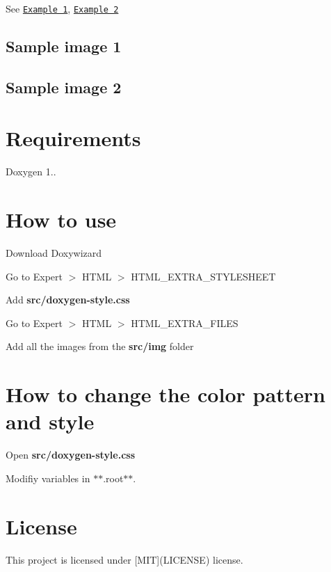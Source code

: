 See \href{http://kcwongjoe.code.com/directshow_camera/index.html}{\tt Example 1}, \href{http://kcwongjoe.code.com/serial_port/index.html}{\tt Example 2}

\subsection*{Sample image 1}



\subsection*{Sample image 2}



\section*{Requirements}

Doxygen 1..

\section*{How to use}


\begin{DoxyEnumerate}
\item Download Doxywizard
\item Go to Expert $>$ H\+T\+ML $>$ H\+T\+M\+L\+\_\+\+E\+X\+T\+R\+A\+\_\+\+S\+T\+Y\+L\+E\+S\+H\+E\+ET

Add {\bfseries src/doxygen-\/style.\+css}
\item Go to Expert $>$ H\+T\+ML $>$ H\+T\+M\+L\+\_\+\+E\+X\+T\+R\+A\+\_\+\+F\+I\+L\+ES

Add all the images from the {\bfseries src/img} folder
\end{DoxyEnumerate}

\section*{How to change the color pattern and style}


\begin{DoxyEnumerate}
\item Open {\bfseries src/doxygen-\/style.\+css}
\item Modifiy variables in $\ast$$\ast$.root$\ast$$\ast$.
\end{DoxyEnumerate}

\section*{License}

This project is licensed under \mbox{[}M\+IT\mbox{]}(L\+I\+C\+E\+N\+SE) license. 